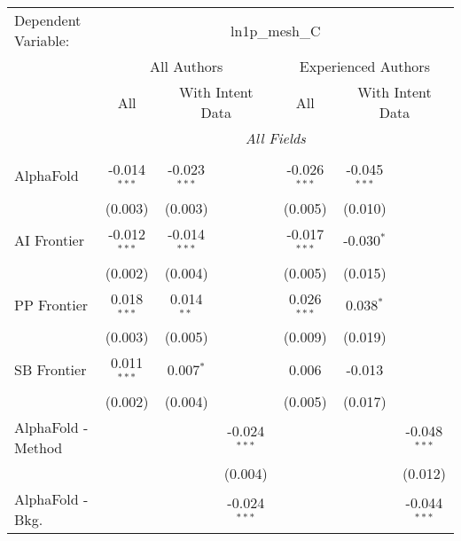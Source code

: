 \begingroup
\centering
\begin{tabular}{lcccccc}
   \tabularnewline \midrule \midrule
   Dependent Variable: & \multicolumn{6}{c}{ln1p\_mesh\_C}\\
 & \multicolumn{3}{c}{All Authors} & \multicolumn{3}{c}{Experienced Authors} \\
\cmidrule(lr){2-4} \cmidrule(lr){5-7}
 & \multicolumn{1}{c}{All} & \multicolumn{2}{c}{With Intent Data} & \multicolumn{1}{c}{All} & \multicolumn{2}{c}{With Intent Data} \\
\cmidrule(lr){2-2} \cmidrule(lr){3-4} \cmidrule(lr){5-5} \cmidrule(lr){6-7}
 & \multicolumn{6}{c}{\textit{All Fields}} \\ \\
   AlphaFold                     & -0.014$^{***}$ & -0.023$^{***}$ &                & -0.026$^{***}$ & -0.045$^{***}$ &   \\   
                                 & (0.003)        & (0.003)        &                & (0.005)        & (0.010)        &   \\   
   AI Frontier                   & -0.012$^{***}$ & -0.014$^{***}$ &                & -0.017$^{***}$ & -0.030$^{*}$   &   \\   
                                 & (0.002)        & (0.004)        &                & (0.005)        & (0.015)        &   \\   
   PP Frontier                   & 0.018$^{***}$  & 0.014$^{**}$   &                & 0.026$^{***}$  & 0.038$^{*}$    &   \\   
                                 & (0.003)        & (0.005)        &                & (0.009)        & (0.019)        &   \\   
   SB Frontier                   & 0.011$^{***}$  & 0.007$^{*}$    &                & 0.006          & -0.013         &   \\   
                                 & (0.002)        & (0.004)        &                & (0.005)        & (0.017)        &   \\   
   AlphaFold - Method            &                &                & -0.024$^{***}$ &                &                & -0.048$^{***}$\\   
                                 &                &                & (0.004)        &                &                & (0.012)\\   
   AlphaFold - Bkg.              &                &                & -0.024$^{***}$ &                &                & -0.044$^{***}$\\   

\end{tabular}
